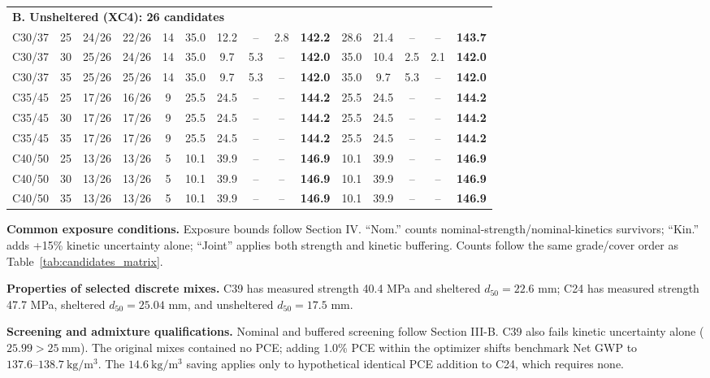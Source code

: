 \documentclass[journal]{IEEEtran}
\begin{document}
\begin{table}[!h]
\begin{tabular*}{\textwidth}{@{\extracolsep{\fill}}lc ccc ccccc ccccc@{}}
\midrule
\multicolumn{15}{l}{\textbf{B. Unsheltered (XC4): 26 candidates}} \\
C30/37 & 25 & 24/26 & 22/26 & 14 & 35.0 & 12.2 & -- & 2.8 & \textbf{142.2} & 28.6 & 21.4 & -- & -- & \textbf{143.7} \\
C30/37 & 30 & 25/26 & 24/26 & 14 & 35.0 & 9.7 & 5.3 & -- & \textbf{142.0} & 35.0 & 10.4 & 2.5 & 2.1 & \textbf{142.0} \\
C30/37 & 35 & 25/26 & 25/26 & 14 & 35.0 & 9.7 & 5.3 & -- & \textbf{142.0} & 35.0 & 9.7 & 5.3 & -- & \textbf{142.0} \\
\addlinespace[2pt]
C35/45 & 25 & 17/26 & 16/26 & 9 & 25.5 & 24.5 & -- & -- & \textbf{144.2} & 25.5 & 24.5 & -- & -- & \textbf{144.2} \\
C35/45 & 30 & 17/26 & 17/26 & 9 & 25.5 & 24.5 & -- & -- & \textbf{144.2} & 25.5 & 24.5 & -- & -- & \textbf{144.2} \\
C35/45 & 35 & 17/26 & 17/26 & 9 & 25.5 & 24.5 & -- & -- & \textbf{144.2} & 25.5 & 24.5 & -- & -- & \textbf{144.2} \\
\addlinespace[2pt]
C40/50 & 25 & 13/26 & 13/26 & 5 & 10.1 & 39.9 & -- & -- & \textbf{146.9} & 10.1 & 39.9 & -- & -- & \textbf{146.9} \\
C40/50 & 30 & 13/26 & 13/26 & 5 & 10.1 & 39.9 & -- & -- & \textbf{146.9} & 10.1 & 39.9 & -- & -- & \textbf{146.9} \\
C40/50 & 35 & 13/26 & 13/26 & 5 & 10.1 & 39.9 & -- & -- & \textbf{146.9} & 10.1 & 39.9 & -- & -- & \textbf{146.9} \\
\bottomrule
\end{tabular*}
\end{table}

{\footnotesize
\noindent\textbf{Common exposure conditions.} Exposure bounds follow Section IV. ``Nom.'' counts nominal-strength/nominal-kinetics survivors; ``Kin.'' adds +15\% kinetic uncertainty alone; ``Joint'' applies both strength and kinetic buffering. Counts follow the same grade/cover order as Table~\ref{tab:candidates_matrix}.

\medskip
\noindent\textbf{Properties of selected discrete mixes.} C39 has measured strength 40.4 MPa and sheltered $d_{50}=22.6$ mm; C24 has measured strength 47.7 MPa, sheltered $d_{50}=25.04$ mm, and unsheltered $d_{50}=17.5$ mm.

\medskip
\noindent\textbf{Screening and admixture qualifications.} Nominal and buffered screening follow Section III-B. C39 also fails kinetic uncertainty alone ($25.99>25\ \mathrm{mm}$). The original mixes contained no PCE; adding 1.0\% PCE within the optimizer shifts benchmark Net GWP to $137.6\text{--}138.7\ \mathrm{kg/m^3}$. The $14.6\ \mathrm{kg/m^3}$ saving applies only to hypothetical identical PCE addition to C24, which requires none.

}
\end{document}
